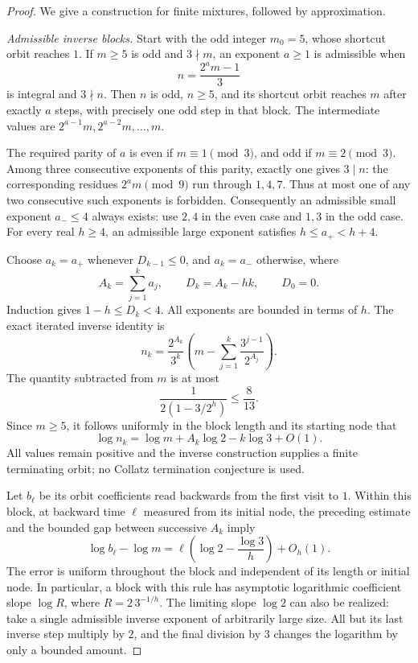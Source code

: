 \documentclass[11pt,a4paper]{article}
\theoremstyle{definition}
\theoremstyle{remark}
\numberwithin{equation}{section}
\begin{document}
\begin{proof}
We give a construction for finite mixtures, followed by approximation.

\emph{Admissible inverse blocks.}
Start with the odd integer $m_0=5$, whose shortcut orbit reaches $1$.
If $m\ge5$ is odd and $3\nmid m$, an exponent $a\ge1$ is admissible
when
\[
 n=\frac{2^a m-1}{3}
\]
is integral and $3\nmid n$. Then $n$ is odd, $n\ge5$, and its
shortcut orbit reaches $m$ after exactly $a$ steps, with precisely
one odd step in that block. The intermediate values are
$2^{a-1}m,2^{a-2}m,\ldots,m$.

The required parity of $a$ is even if $m\equiv1\pmod3$, and odd
if $m\equiv2\pmod3$. Among three consecutive exponents of this
parity, exactly one gives $3\mid n$: the corresponding residues
$2^a m\pmod9$ run through $1,4,7$. Thus at most one of any two
consecutive such exponents is forbidden. Consequently an admissible
small exponent $a_-\le4$ always exists: use $2,4$ in the even case
and $1,3$ in the odd case. For every real $h\ge4$, an admissible
large exponent satisfies $h\le a_+<h+4$.

Choose $a_k=a_+$ whenever $D_{k-1}\le0$, and $a_k=a_-$ otherwise,
where
\[
 A_k=\sum_{j=1}^k a_j,\qquad D_k=A_k-hk,\qquad D_0=0.
\]
Induction gives $1-h\le D_k<4$. All exponents are bounded in terms
of $h$. The exact iterated inverse identity is
\[
 n_k=\frac{2^{A_k}}{3^k}
 \left(m-\sum_{j=1}^k\frac{3^{j-1}}{2^{A_j}}\right).
\]
The quantity subtracted from $m$ is at most
\[
 \frac1{2(1-3/2^h)}\le\frac8{13}.
\]
Since $m\ge5$, it follows uniformly in the block length and its
starting node that
\[
 \log n_k=\log m+A_k\log2-k\log3+O(1).
\]
All values remain positive and the inverse construction supplies a
finite terminating orbit; no Collatz termination conjecture is used.

Let $b_\ell$ be its orbit coefficients read backwards from the first
visit to $1$. Within this block, at backward time $\ell$ measured
from its initial node, the preceding estimate and the bounded gap
between successive $A_k$ imply
\[
 \log b_\ell-\log m
 =\ell\left(\log2-\frac{\log3}{h}\right)+O_h(1).
\]
The error is uniform throughout the block and independent of its
length or initial node. In particular, a block with this rule has
asymptotic logarithmic coefficient slope $\log R$, where
$R=2\,3^{-1/h}$. The limiting slope $\log2$ can also be realized:
take a single admissible inverse exponent of arbitrarily large size.
All but its last inverse step multiply by $2$, and the final division
by $3$ changes the logarithm by only a bounded amount.


\end{proof}
\end{document}
